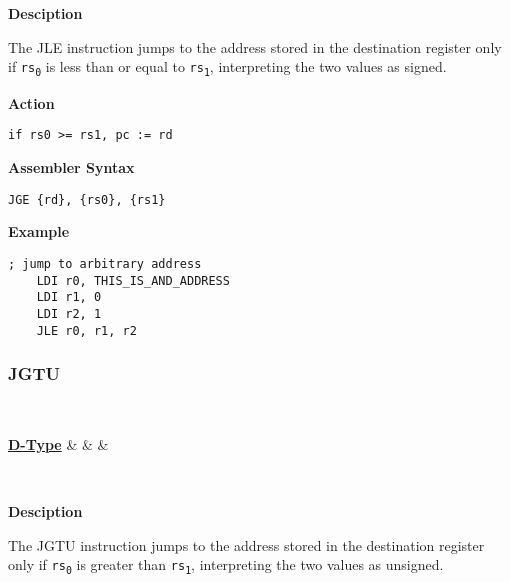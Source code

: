 \textbf{Desciption}

The JLE instruction jumps to the address stored in the destination register only if \texttt{rs\textsubscript{0}} is less than or equal to \texttt{rs\textsubscript{1}},
interpreting the two values as signed.

\vspace{3ex}

\textbf{Action}
\begin{lstlisting}[frame=single]
	if rs0 >= rs1, pc := rd
\end{lstlisting}

\vspace{3ex}

\textbf{Assembler Syntax}
\begin{lstlisting}[frame=single]
	JGE {rd}, {rs0}, {rs1}
\end{lstlisting}

\vspace{3ex}

\textbf{Example}
\begin{lstlisting}[frame=single]
	; jump to arbitrary address
	LDI r0, THIS_IS_AND_ADDRESS
	LDI r1, 0
	LDI r2, 1
	JLE r0, r1, r2
\end{lstlisting}

\subsubsection{JGTU }\label{sec:JGTU}

\vspace{3ex}

\begin{center}
	\begin{bytefield}[leftcurly=., leftcurlyspace=0pt]{32}
		 \\
		\begin{leftwordgroup}{\hyperref[sec:r-type]{\textbf{D-Type}}}
		 & 
		 &
		 &
		\end{leftwordgroup}\\
	\end{bytefield}
\end{center}

\textbf{Desciption}

The JGTU instruction jumps to the address stored in the destination register only if \texttt{rs\textsubscript{0}} is greater than \texttt{rs\textsubscript{1}},
interpreting the two values as unsigned.

